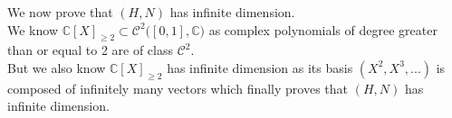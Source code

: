 \documentclass{article}
\begin{document}
\noindent We now prove that $(H, N)$ has infinite dimension. \\
We know $\mathbb{C}[X]_{\geq 2} \subset \mathcal{C}^2\big( [0,1] , \mathbb{C} \big)$ as complex polynomials of degree greater than or equal to 2 are of class $\mathcal{C}^2$. \\
But we also know $\mathbb{C}[X]_{\geq 2}$ has infinite dimension as its basis $(X^2, X^3, ...)$ is composed of infinitely many vectors which finally proves that $(H, N)$ has infinite dimension. 
\end{document}

